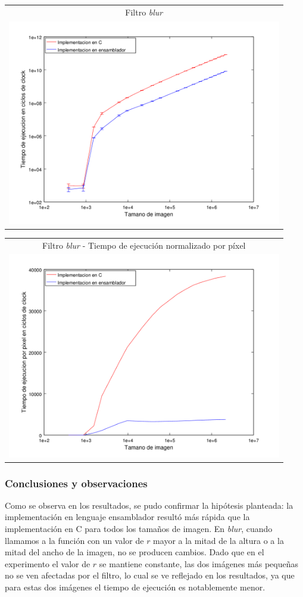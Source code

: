 			{\centering \begin{tabular}{c}
		      {\small Filtro \emph{blur}} \\
		      \includegraphics[width=12cm]{../exp/graficos/exp1-blur-c_vs_asm.png} \\
		    \end{tabular}}

		   	{\centering \begin{tabular}{c}
		      {\small Filtro \emph{blur} - Tiempo de ejecución normalizado por píxel} \\
		      \includegraphics[width=12cm]{../exp/graficos/exp1-blur-tiempo_por_pixel.png} \\
		    \end{tabular}}

		\subsubsection*{Conclusiones y observaciones} 
			Como se observa en los resultados, se pudo confirmar la hipótesis planteada: la implementación en lenguaje ensamblador resultó más rápida que la implementación en C para todos los tamaños de imagen.
			En \emph{blur}, cuando llamamos a la función con un valor de $r$ mayor a la mitad de la altura o a la mitad del ancho de la imagen, no se producen cambios. Dado que en el experimento el valor de $r$ se mantiene constante, las dos imágenes más pequeñas no se ven afectadas por el filtro, lo cual se ve reflejado en los resultados, ya que para estas dos imágenes el tiempo de ejecución es notablemente menor.

